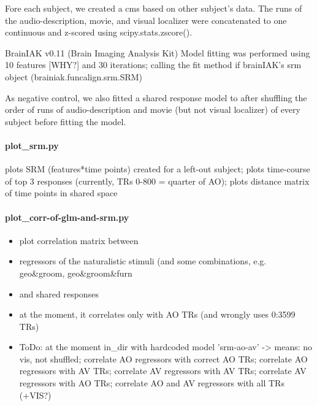 
Fore each subject, we created a \ac{cms} based on other subject's data.
%
The runs of the audio-description, movie, and visual localizer were concatenated
to one continuous and z-scored using scipy.stats.zscore().


BrainIAK v0.11 (Brain Imaging Analysis Kit) \citep{kumar2020brainiak, kumar2020brainiaktutorial}
Model fitting was performed using 10 features [WHY?] and 30 iterations; calling
the fit method if brainIAK's srm object (brainiak.funcalign.srm.SRM)

As negative control, we also fitted a shared response model to after shuffling
the order of runs of audio-description and movie (but not visual localizer) of
every subject before fitting the model.


\paragraph{plot\_srm.py}

%
plots SRM (features*time points) created for a left-out subject; plots
time-course of top 3 responses (currently, TRs 0-800 = quarter of AO); plots
distance matrix of time points in shared space


\paragraph{plot\_corr-of-glm-and-srm.py}
%
\begin{itemize}
    \item plot correlation matrix between
    \item regressors of the naturalistic stimuli (and some combinations, e.g.
        geo\&groom, geo\&groom\&furn
    \item and shared responses
    \item at the moment, it correlates only with AO TRs (and wrongly uses
        0:3599 TRs)
    \item ToDo: at the moment in\_dir with hardcoded model 'srm-ao-av'
    ->  means: no vis, not shuffled; correlate AO regressors with correct AO
        TRs; correlate AO regressors with AV TRs; correlate AV regressors with
        AV TRs; correlate AV regressors with AO TRs; correlate AO and AV
        regressors with all TRs (+VIS?)
\end{itemize}


